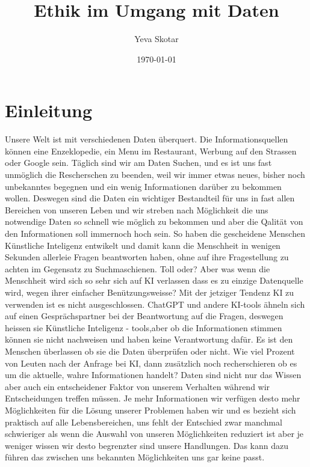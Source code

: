 \documentclass{report}
\title{Ethik im Umgang mit Daten}
\author{Yeva Skotar}
\date{\today}
\begin{document}
\maketitle


\tableofcontents

\chapter{Einleitung}
Unsere Welt ist mit verschiedenen Daten überquert. Die Informationsquellen können eine Enzeklopedie, ein Menu im Restaurant, Werbung auf den Strassen oder Google sein.
Täglich sind wir am Daten Suchen, und es ist uns fast unmöglich die Rescherschen zu beenden, weil wir immer etwas neues, bisher noch unbekanntes 
begegnen und ein wenig Informationen darüber zu bekommen wollen.
Deswegen sind die Daten ein wichtiger Bestandteil für uns in fast allen Bereichen von unseren Leben 
und wir streben nach Möglichkeit die uns notwendige Daten so schnell wie möglich zu bekommen 
und aber die Qalität von den Informationen soll immernoch hoch sein. So haben die gescheidene Menschen Künstliche Inteligenz
entwikelt und damit kann die Menschheit in wenigen Sekunden allerleie Fragen beantworten haben, ohne auf ihre Fragestellung zu achten im Gegensatz zu Suchmaschienen.
Toll oder? Aber was wenn die Menschheit wird sich so sehr sich auf KI verlassen 
dass es zu einzige Datenquelle wird, wegen ihrer einfacher Benützungsweisse? Mit der jetziger Tendenz KI zu verwenden ist es nicht ausgeschlossen. ChatGPT und andere KI-tools ähneln sich auf
 einen Gesprächspartner bei der Beantwortung auf die Fragen, deswegen heissen sie Künstliche Inteligenz - tools,aber ob die Informationen stimmen können sie nicht nachweisen und haben keine Verantwortung dafür. 
Es ist den Menschen überlassen 
ob sie die Daten überprüfen oder nicht. Wie viel Prozent von Leuten nach der Anfrage bei KI, dann zusätzlich noch recherschieren ob es um die aktuelle, wahre Informationen handelt?
 Daten sind nicht nur das Wissen aber auch ein entscheidener Faktor von unserem Verhalten während wir Entscheidungen treffen müssen.
Je mehr Informationen wir verfügen desto mehr Möglichkeiten für die Lösung unserer Problemen haben wir und es bezieht sich praktisch auf alle Lebensbereichen,
 uns fehlt der Entschied zwar manchmal schwieriger als wenn die Auswahl von unseren Möglichkeiten reduziert ist aber je weniger wissen wir desto begrenzter sind unsere Handlungen.
Das kann dazu führen das zwischen uns bekannten Möglichkeiten uns gar keine passt. 
\end{document}

